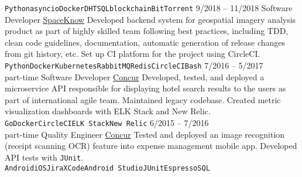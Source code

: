 \documentclass[9pt]{developercv} %
\begin{document}
\begin{entrylist}
{          \texttt{Python}\slashsep\texttt{asyncio}\slashsep\texttt{Docker}\slashsep\texttt{DHT}\slashsep\texttt{SQL}\slashsep\texttt{blockchain}\slashsep\texttt{BitTorrent}
        }
	\entry
		{9/2018 -- 11/2018}
		{Software Developer}
        {\href{https://spaceknow.com/}{SpaceKnow}}
        {Developed backend system for geospatial imagery analysis product as part of highly skilled team following best practices, including TDD, clean code guidelines, documentation, automatic generation of release changes from git history, etc. Set up CI platform for the project using CircleCI.\\
        \texttt{Python}\slashsep\texttt{Docker}\slashsep\texttt{Kubernetes}\slashsep\texttt{RabbitMQ}\slashsep\texttt{Redis}\slashsep\texttt{CircleCI}\slashsep\texttt{Bash}}
	\entry
		{7/2016 -- 5/2017\\\footnotesize{part-time}}
		{Software Developer}
        {\href{https://www.concur.com/}{Concur}}
        {
          Developed, tested, and deployed a microservice API responsible for displaying hotel search results to the users as part of international agile team. Maintained legacy codebase. Created metric visualization dashboards with ELK Stack and New Relic. \\ 
        \texttt{Go}\slashsep\texttt{Docker}\slashsep\texttt{CircleCI}\slashsep\texttt{ELK Stack}\slashsep\texttt{New Relic}
        }
	\entry
        {6/2015 -- 7/2016\\\footnotesize{part-time}}
		{Quality Engineer}
        {\href{https://www.concur.com/}{Concur}}
        {
          Tested and deployed an image recognition (receipt scanning OCR) feature into expense management mobile app. Developed API tests with \texttt{JUnit}.\\
          \texttt{Android}\slashsep\texttt{iOS}\slashsep\texttt{Jira}\slashsep\texttt{XCode}\slashsep\texttt{Android Studio}\slashsep\texttt{JUnit}\slashsep\texttt{Espresso}\slashsep\texttt{SQL}
        }
\end{entrylist}

\end{document}
